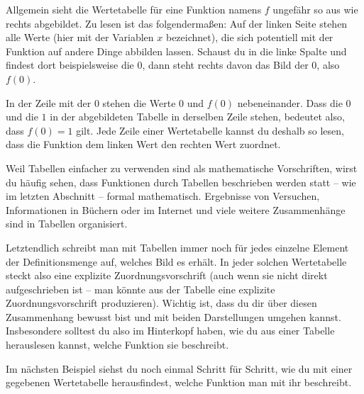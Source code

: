 \documentclass[../../main.tex]{subfiles}
\begin{document}
Allgemein sieht die Wertetabelle für eine Funktion namens $f$ ungefähr so aus wie rechts abgebildet. Zu lesen ist das folgendermaßen: Auf der linken Seite stehen alle Werte (hier mit der Variablen $x$ bezeichnet), die sich potentiell mit der Funktion auf andere Dinge abbilden lassen. Schaust du in die linke Spalte und findest dort beispielsweise die $0$, dann steht rechts davon das Bild der $0$, also $f(0)$. 

In der Zeile mit der $0$ stehen die Werte $0$ und $f(0)$ nebeneinander. Dass die $0$ und die $1$ in der abgebildeten Tabelle in derselben Zeile stehen, bedeutet also, dass $f(0)=1$ gilt. Jede Zeile einer Wertetabelle kannst du deshalb so lesen, dass die Funktion dem linken Wert den rechten Wert zuordnet.

Weil Tabellen einfacher zu verwenden sind als mathematische Vorschriften, wirst du häufig sehen, dass Funktionen durch Tabellen beschrieben werden statt -- wie im letzten Abschnitt -- formal mathematisch. Ergebnisse von Versuchen, Informationen in Büchern oder im Internet und viele weitere Zusammenhänge sind in Tabellen organisiert.

Letztendlich schreibt man mit Tabellen immer noch für jedes einzelne Element der Definitionsmenge auf, welches Bild es erhält. In jeder solchen Wertetabelle steckt also eine explizite Zuordnungsvorschrift (auch wenn sie nicht direkt aufgeschrieben ist -- man könnte aus der Tabelle eine explizite Zuordnungsvorschrift produzieren). Wichtig ist, dass du dir über diesen Zusammenhang bewusst bist und mit beiden Darstellungen umgehen kannst. Insbesondere solltest du also im Hinterkopf haben, wie du aus einer Tabelle herauslesen kannst, welche Funktion sie beschreibt.

Im nächsten Beispiel siehst du noch einmal Schritt für Schritt, wie du mit einer gegebenen Wertetabelle herausfindest, welche Funktion man mit ihr beschreibt.
\end{document}
